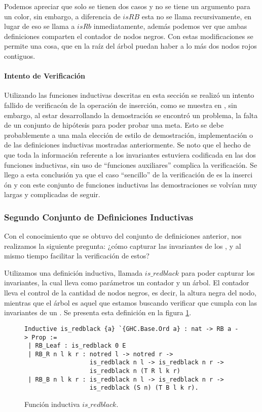 Podemos apreciar que solo se tienen dos casos y no se tiene un argumento para un color, sin
embargo, a diferencia de $isRB$ esta no se llama recursivamente, en lugar de eso se llama a $isRb$
inmediatamente, además podemos ver que ambas definiciones comparten el contador de nodos negros.
Con estas modificaciones se permite una cosa, que en la ra\'iz del \'arbol puedan haber a lo m\'as
dos nodos rojos contiguos.

\paragraph{Intento de Verificaci\'on}
Utilizando las funciones inductivas descritas en esta secci\'on se realiz\'o un intento fallido de
verificac\'on de la operaci\'on de inserci\'on, como se muestra en \cite{appel}, sin embargo, al
estar desarrollando la demostraci\'on se encontró un problema, la falta de un conjunto de
hipótesis para poder probar una meta. Esto se debe probablemente a una mala elección de estilo de
demostraci\'on, implementaci\'on o de las definiciones inductivas mostradas anteriormente. Se noto
que el hecho de que toda la informaci\'on referente a los invariantes estuviera codificada en las
dos funciones inductivas, sin uso de ``funciones auxiliares'' complica la verificaci\'on. Se
llego a esta conclusi\'on ya que el caso ``sencillo'' de la verificaci\'on de {\arns} es la inserci
\'on y con este conjunto de funciones inductivas las demostraciones se volvían muy largas y
complicadas de seguir.

\subsubsection{Segundo Conjunto de Definiciones Inductivas}

Con el conocimiento que se obtuvo del conjunto de definiciones anterior, nos realizamos la
siguiente pregunta: ¿c\'omo capturar las invariantes de los {\arns}, y al mismo tiempo facilitar la
verificaci\'on de estos?

Utilizamos una definición inductiva, llamada $is\_redblack$ para poder capturar los invariantes,
la cual lleva como parámetros un contador y un \'arbol. El contador lleva el control de la
cantidad de nodos negros, es decir, la altura negra del nodo, mientras que el \'arbol es aquel que
estamos buscando verificar que cumpla con las invariantes de un {\arn}. Se presenta esta definici\'
on en la figura \ref{inductive_isRedB}.

\begin{figure}[!ht]
\centering
\captionsetup{justification=centering}
\begin{verbatim}
Inductive is_redblack {a} `{GHC.Base.Ord a} : nat -> RB a -> Prop :=
 | RB_Leaf : is_redblack 0 E
 | RB_R n l k r : notred l -> notred r ->
                  is_redblack n l -> is_redblack n r ->
                  is_redblack n (T R l k r)
 | RB_B n l k r : is_redblack n l -> is_redblack n r ->
                  is_redblack (S n) (T B l k r).
\end{verbatim}
\caption{Funci\'on inductiva $is\_redblack$.}
\label{inductive_isRedB}
\end{figure}

